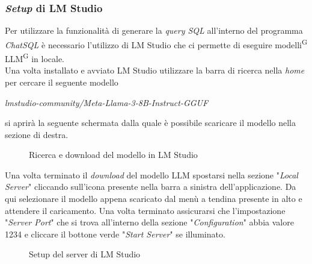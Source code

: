 \documentclass[5pt]{article}
\newlength\myheight
\newlength\mydepth
\newcommand*\inlinegraphics[1]{%
	\settototalheight\myheight{Xygp}%
	\settodepth\mydepth{Xygp}%
	\raisebox{-\mydepth}{\texttt{[image: \#1]}}%
}
\begin{document}
			\subsubsection{\textit{Setup} di LM Studio}
			Per utilizzare la funzionalità di generare la \textit{query SQL} all'interno del programma \textit{ChatSQL} è necessario l'utilizzo di LM Studio che ci permette di eseguire modelli\textsuperscript{G} LLM\textsuperscript{G} in locale.\\
			Una volta installato e avviato LM Studio utilizzare la barra di ricerca nella \textit{home} per cercare il seguente modello
			\begin{center}
				\textit{lmstudio-community/Meta-Llama-3-8B-Instruct-GGUF}
			\end{center}
			si aprirà la seguente schermata dalla quale è possibile scaricare il modello nella sezione di destra.
			\begin{figure}[ht]
				\centering
				\caption{Ricerca e download del modello in LM Studio}
			\end{figure}
			Una volta terminato il \textit{download} del modello LLM spostarsi nella sezione "\textit{Local Server}" cliccando sull'icona \inlinegraphics{User_Manual/local_server_icon.png} presente nella barra a sinistra dell'applicazione.
			Da qui selezionare il modello appena scaricato dal menù a tendina presente in alto e attendere il caricamento. Una volta terminato assicurarsi che l'impostazione "\textit{Server Port}" che si trova all'interno della sezione "\textit{Configuration}" abbia valore 1234 e cliccare il bottone verde "\textit{Start Server}" se illuminato.
			\begin{figure}[ht]
				\centering
				\caption{Setup del server di LM Studio}
			\end{figure}
			
\end{document}
